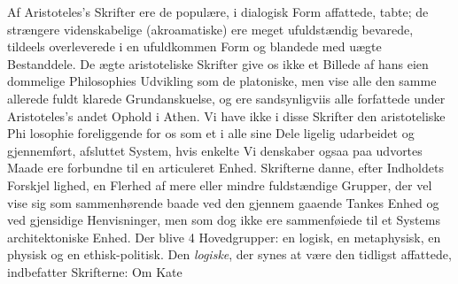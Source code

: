 \documentclass[12pt,a4paper]{book}
\newcommand{\gk}[1]{\textit{#1}}
\begin{document}
Af Aristoteles's Skrifter ere de populære, i dialogisk Form
affattede, tabte; de strængere videnskabelige (akroamatiske)
ere meget ufuldstændig bevarede, tildeels overleverede i en
ufuldkommen Form og blandede med uægte Bestanddele. De
ægte aristoteliske Skrifter give os ikke et Billede af hans eien\-%
dommelige Philosophies Udvikling som de platoniske, men vise
alle den samme allerede fuldt klarede Grundanskuelse, og ere
sandsynligviis alle forfattede under Aristoteles's andet Ophold
i Athen. Vi have ikke i disse Skrifter den aristoteliske Phi\-%
losophie foreliggende for os som et i alle sine Dele ligelig
udarbeidet og gjennemført, afsluttet System, hvis enkelte Vi\-%
denskaber ogsaa paa udvortes Maade ere forbundne til en
articuleret Enhed. Skrifterne danne, efter Indholdets Forskjel\-%
lighed, en Flerhed af mere eller mindre fuldstændige Grupper,
der vel vise sig som sammenhørende baade ved den gjennem\-%
gaaende Tankes Enhed og ved gjensidige Henvisninger, men
som dog ikke ere sammenføiede til et Systems architektoniske
Enhed. Der blive 4 Hovedgrupper: en logisk, en metaphysisk,
en physisk og en ethisk-politisk. Den \emph{logiske}, der synes at
være den tidligst affattede, indbefatter Skrifterne: Om Kate\-%
\end{document}
